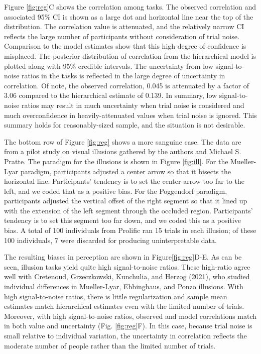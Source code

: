 \documentclass[
  ,man]{apa6}
\begin{document}
Figure \ref{fig:reg}C shows the correlation among tasks. The observed correlation and associated 95\% CI is shown as a large dot and horizontal line near the top of the distribution. The correlation value is attenuated, and the relatively narrow CI reflects the large number of participants without consideration of trial noise. Comparison to the model estimates show that this high degree of confidence is misplaced. The posterior distribution of correlation from the hierarchical model is plotted along with 95\% credible intervals. The uncertainty from low signal-to-noise ratios in the tasks is reflected in the large degree of uncertainty in correlation. Of note, the observed correlation, 0.045 is attenuated by a factor of 3.06 compared to the hierarchical estimate of 0.139. In summary, low signal-to-noise ratios may result in much uncertainty when trial noise is considered and much overconfidence in heavily-attenuated values when trial noise is ignored. This summary holds for reasonably-sized sample, and the situation is not desirable.

The bottom row of Figure \ref{fig:reg} shows a more sanguine case. The data are from a pilot study on visual illusions gathered by the authors and Michael S. Pratte. The paradigm for the illusions is shown in Figure \ref{fig:ill}. For the Mueller-Lyar paradigm, participants adjusted a center arrow so that it bisects the horizontal line. Participants' tendency is to set the center arrow too far to the left, and we coded that as a positive bias. For the Poggendorf paradigm, participants adjusted the vertical offset of the right segment so that it lined up with the extension of the left segment through the occluded region. Participants' tendency is to set this segment too far down, and we coded this as a positive bias. A total of 100 individuals from Prolific ran 15 trials in each illusion; of these 100 individuals, 7 were discarded for producing uninterpretable data.

The resulting biases in perception are shown in Figure\ref{fig:reg}D-E. As can be seen, illusion tasks yield quite high signal-to-noise ratios. These high-ratio agree well with Cretenoud, Grzeczkowski, Kunchulia, and Herzog (2021), who studied individual differences in Mueller-Lyar, Ebbinghaus, and Ponzo illusions. With high signal-to-noise ratios, there is little regularization and sample mean estimates match hierarchical estimates even with the limited number of trials. Moreover, with high signal-to-noise ratios, observed and model correlations match in both value and uncertainty (Fig. \ref{fig:reg}F). In this case, because trial noise is small relative to individual variation, the uncertainty in correlation reflects the moderate number of people rather than the limited number of trials.
\end{document}
